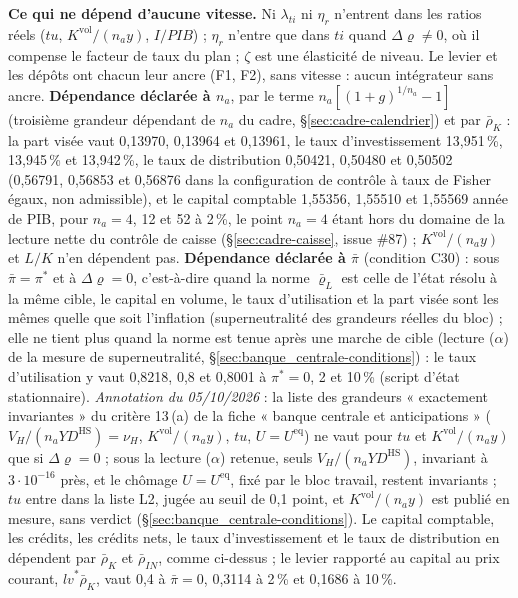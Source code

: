 \documentclass[11pt,a4paper]{article}
\begin{document}
\begin{proposee}
\textbf{Ce qui ne dépend d'aucune vitesse.} Ni $\lambda_{\mathit{ti}}$ ni $\eta_r$ n'entrent dans les ratios réels ($\mathit{tu}$, $K^{\mathrm{vol}}/(n_a y)$, $I/\mathit{PIB}$) ; $\eta_r$ n'entre que dans $\mathit{ti}$ quand $\Delta\varrho \ne 0$, où il compense le facteur de taux du plan ; $\zeta$ est une élasticité de niveau. Le levier et les dépôts ont chacun leur ancre (F1, F2), sans vitesse : aucun intégrateur sans ancre. \textbf{Dépendance déclarée à $n_a$}, par le terme $n_a[(1 + g)^{1/n_a} - 1]$ (troisième grandeur dépendant de $n_a$ du cadre, \S\ref{sec:cadre-calendrier}) et par $\bar\rho_K$ : la part visée vaut 0,13970, 0,13964 et 0,13961, le taux d'investissement 13,951\,\%, 13,945\,\% et 13,942\,\%, le taux de distribution 0,50421, 0,50480 et 0,50502 (0,56791, 0,56853 et 0,56876 dans la configuration de contrôle à taux de Fisher égaux, non admissible), et le capital comptable 1,55356, 1,55510 et 1,55569 année de PIB, pour $n_a = 4$, 12 et 52 à 2\,\%, le point $n_a = 4$ étant hors du domaine de la lecture nette du contrôle de caisse (\S\ref{sec:cadre-caisse}, issue \#87) ; $K^{\mathrm{vol}}/(n_a y)$ et $L/K$ n'en dépendent pas. \textbf{Dépendance déclarée à $\bar\pi$} (condition C30) : sous $\bar\pi = \pi^\ast$ et à $\Delta\varrho = 0$, c'est-à-dire quand la norme $\bar\varrho_L$ est celle de l'état résolu à la même cible, le capital en volume, le taux d'utilisation et la part visée sont les mêmes quelle que soit l'inflation (superneutralité des grandeurs réelles du bloc) ; elle ne tient plus quand la norme est tenue après une marche de cible (lecture ($\alpha$) de la mesure de superneutralité, \S\ref{sec:banque_centrale-conditions}) : le taux d'utilisation y vaut 0,8218, 0,8 et 0,8001 à $\pi^\ast = 0$, 2 et 10\,\% (script d'état stationnaire). \emph{Annotation du 05/10/2026} : la liste des grandeurs « exactement invariantes » du critère 13\,(a) de la fiche « banque centrale et anticipations » ($V_H/(n_a\mathit{YD}^{\mathrm{HS}}) = \nu_H$, $K^{\mathrm{vol}}/(n_a y)$, $\mathit{tu}$, $U = U^{\mathrm{eq}}$) ne vaut pour $\mathit{tu}$ et $K^{\mathrm{vol}}/(n_a y)$ que si $\Delta\varrho = 0$ ; sous la lecture ($\alpha$) retenue, seuls $V_H/(n_a\mathit{YD}^{\mathrm{HS}})$, invariant à $3 \cdot 10^{-16}$ près, et le chômage $U = U^{\mathrm{eq}}$, fixé par le bloc travail, restent invariants ; $\mathit{tu}$ entre dans la liste L2, jugée au seuil de 0,1 point, et $K^{\mathrm{vol}}/(n_a y)$ est publié en mesure, sans verdict (\S\ref{sec:banque_centrale-conditions}). Le capital comptable, les crédits, les crédits nets, le taux d'investissement et le taux de distribution en dépendent par $\bar\rho_K$ et $\bar\rho_{\mathit{IN}}$, comme ci-dessus ; le levier rapporté au capital au prix courant, $\mathit{lv}^\ast\bar\rho_K$, vaut 0,4 à $\bar\pi = 0$, 0,3114 à 2\,\% et 0,1686 à 10\,\%.


\end{proposee}
\end{document}
